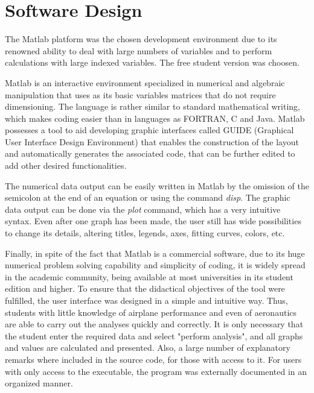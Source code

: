 \documentclass[10pt]{SelfArx} %
\begin{document}
\section{Software Design}
The Matlab\textsuperscript{\textregistered}  platform was the chosen development environment due to its renowned ability to deal with  large numbers of variables and to perform calculations with large indexed variables.  The free student version was choosen.

Matlab\textsuperscript{\textregistered} is  an interactive environment specialized in numerical and algebraic manipulation that uses as its basic variables  matrices that do not require dimensioning. The language is rather similar to standard mathematical writing, which makes coding  easier than in  languages as  FORTRAN, C and Java. Matlab\textsuperscript{\textregistered} possesses a tool to aid developing graphic interfaces called GUIDE (Graphical User Interface Design Environment) that enables the construction of the layout and automatically generates the associated code, that can be further edited to add other desired functionalities. 

The numerical data output can be easily written in Matlab\textsuperscript{\textregistered} by the omission of the semicolon at the end of an equation or using the command \emph{disp}. The graphic data output can be done via the \emph{plot} command, which has a very intuitive syntax. Even after one graph has been made, the user still has wide possibilities to change its details, altering titles, legends, axes, fitting curves, colors, etc. 

Finally, in spite of the fact that Matlab\textsuperscript{\textregistered} is a commercial software, due to its huge numerical  problem solving capability  and simplicity of coding, it is widely spread in the academic community, being available at most universities in its student edition and higher. To ensure that the didactical  objectives of the tool were fulfilled, the user interface was designed in a simple and intuitive way. Thus, students with little knowledge of airplane performance and even of aeronautics are able to carry out the analyses quickly and correctly.  It is only necessary that the student enter the required data  and select "perform analysis", and all graphs and values are calculated and presented. Also, a large number of explanatory remarks where included in the source code, for those with access to it.  For users with only access to the executable, the program was externally documented in an organized manner. 
\end{document}
